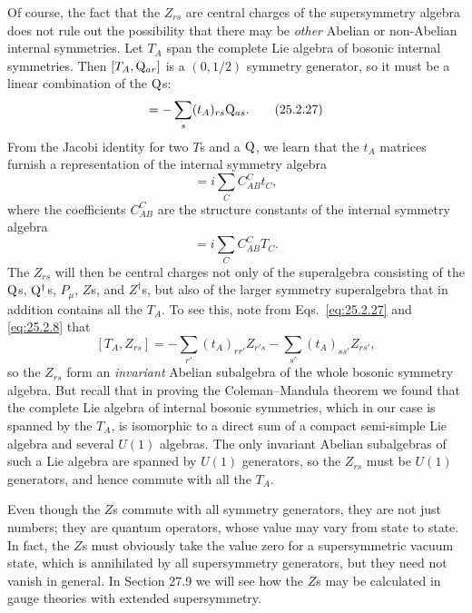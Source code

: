 Of course, the fact that the \(Z_{rs}\) are central charges of the
supersymmetry algebra does not rule out the possibility that there may be
\emph{other} Abelian or non-Abelian internal symmetries. Let \(T_A\) span
the complete Lie algebra of bosonic internal symmetries. Then
\([T_A,\mathrm{Q}_{ar}]\) is a \((0,1/2)\) symmetry generator, so it must be
a linear combination of the \(\mathrm{Q}\)s:
\begin{equation}
[T_A,\WeylQ_{ar}]
=-\sum_s(t_A)_{rs}\WeylQ_{as}.
\tag{25.2.27}\label{eq:25.2.27}
\end{equation}
From the Jacobi identity for two \(T\)s and a \(\mathrm{Q}\), we learn that
the \(t_A\) matrices furnish a representation of the internal symmetry
algebra
\begin{equation}
[t_A,t_B]=i\sum_C C^C_{AB}t_C,
\tag{25.2.28}\label{eq:25.2.28}
\end{equation}
where the coefficients \(C^C_{AB}\) are the structure constants of the
internal symmetry algebra
\begin{equation}
[T_A,T_B]=i\sum_C C^C_{AB}T_C.
\tag{25.2.29}\label{eq:25.2.29}
\end{equation}
The \(Z_{rs}\) will then be central charges not only of the superalgebra
consisting of the \(\mathrm{Q}\)s, \(\mathrm{Q}^\dagger\)s, \(P_\mu\), \(Z\)s,
and \(Z^\dagger\)s, but also of the larger symmetry superalgebra that in
addition
contains all the \(T_A\). To see this, note from
Eqs.~\eqref{eq:25.2.27} and \eqref{eq:25.2.8} that
\[
[T_A,Z_{rs}]
=-\sum_{r'}(t_A)_{rr'}Z_{r's}
-\sum_{s'}(t_A)_{ss'}Z_{rs'},
\]
so the \(Z_{rs}\) form an \emph{invariant} Abelian subalgebra of the whole
bosonic symmetry algebra. But recall that in proving the Coleman--Mandula
theorem we found that the complete Lie algebra of internal bosonic
symmetries, which in our case is spanned by the \(T_A\), is isomorphic to
a direct sum of a compact semi-simple Lie algebra and several \(U(1)\)
algebras. The only invariant Abelian subalgebras of such a Lie algebra are
spanned by \(U(1)\) generators, so the \(Z_{rs}\) must be \(U(1)\)
generators, and hence commute with all the \(T_A\).

Even though the \(Z\)s commute with all symmetry generators, they are not
just numbers; they are quantum operators, whose value may vary from state
to state. In fact, the \(Z\)s must obviously take the value zero for a
supersymmetric vacuum state, which is annihilated by all supersymmetry
generators, but they need not vanish in general. In Section 27.9 we will
see how the \(Z\)s may be calculated in gauge theories with extended
supersymmetry.

